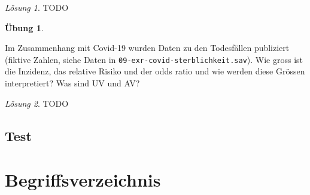 \documentclass[
]{book}
\theoremstyle{definition}
\theoremstyle{definition}
\theoremstyle{definition}
\newtheorem{exercise}{Übung}[chapter]
\theoremstyle{definition}
\theoremstyle{remark}
\newtheorem*{solution}{Lösung}
\begin{document}
\begin{solution}
TODO
\end{solution}

\begin{exercise}
\protect\hypertarget{exr:covid-sterblichkeit}{}\label{exr:covid-sterblichkeit}\leavevmode

Im Zusammenhang mit Covid-19 wurden Daten zu den Todesfällen publiziert (fiktive Zahlen, siehe Daten in \texttt{09-exr-covid-sterblichkeit.sav}). Wie gross ist die Inzidenz, das relative Risiko und der odds ratio und wie werden diese Grössen interpretiert? Was sind UV und AV?

\end{exercise}

\begin{solution}
TODO
\end{solution}

\section{Test}\label{test-5}

\chapter*{Begriffsverzeichnis}\label{begriffsverzeichnis}
\end{document}
